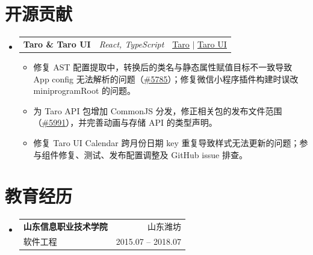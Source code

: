 \documentclass[a4paper,11pt,fontset=fandol,scheme=plain]{ctexart}
\makeatletter
\newcommand{\resumeItem}[1]{
  \item\small{#1}
}
\newcommand{\resumeItemListStart}{\begin{itemize}[rightmargin=0.11in]}
\newcommand{\resumeItemListEnd}{\end{itemize}}
\newcommand{\resumeTrioHeading}[3]{
  \item\small{
    \begin{tabular*}{0.96\textwidth}[t]{
      l@{\extracolsep{\fill}}c@{\extracolsep{\fill}}r
    }
      \textbf{#1} & \textit{#2} & #3
    \end{tabular*}
  }
}
\newcommand{\resumeQuadHeading}[4]{
  \item
  \begin{tabular*}{0.96\textwidth}[t]{l@{\extracolsep{\fill}}r}
    \textbf{#1} & #2 \\
    {\small#3} & {\small #4} \\
  \end{tabular*}
}
\newcommand{\resumeHeadingListStart}{
  \begin{itemize}[leftmargin=0.15in, label={}]
}
\newcommand{\resumeHeadingListEnd}{\end{itemize}}
\makeatother
\begin{document}
\section{开源贡献}
\resumeHeadingListStart{}
  \resumeTrioHeading{Taro \& Taro UI}{React, TypeScript}{\href{https://github.com/NervJS/taro}{\uline{Taro}} $|$ \href{https://github.com/NervJS/taro-ui}{\uline{Taro UI}}}
  \resumeItemListStart{}
    \resumeItem{修复 AST 配置提取中，转换后的类名与静态属性赋值目标不一致导致 App config 无法解析的问题（\href{https://github.com/NervJS/taro/pull/5785}{\uline{\#5785}}）；修复微信小程序插件构建时误改 miniprogramRoot 的问题。}
    \resumeItem{为 Taro API 包增加 CommonJS 分发，修正相关包的发布文件范围（\href{https://github.com/NervJS/taro/pull/5991}{\uline{\#5991}}），并完善动画与存储 API 的类型声明。}
    \resumeItem{修复 Taro UI Calendar 跨月份日期 key 重复导致样式无法更新的问题；参与组件修复、测试、发布配置调整及 GitHub issue 排查。}
  \resumeItemListEnd{}
\resumeHeadingListEnd{}

\section{教育经历}
\resumeHeadingListStart{}
  \resumeQuadHeading{山东信息职业技术学院}{山东潍坊}
    {软件工程}{2015.07 -- 2018.07}
\resumeHeadingListEnd{}
\end{document}
